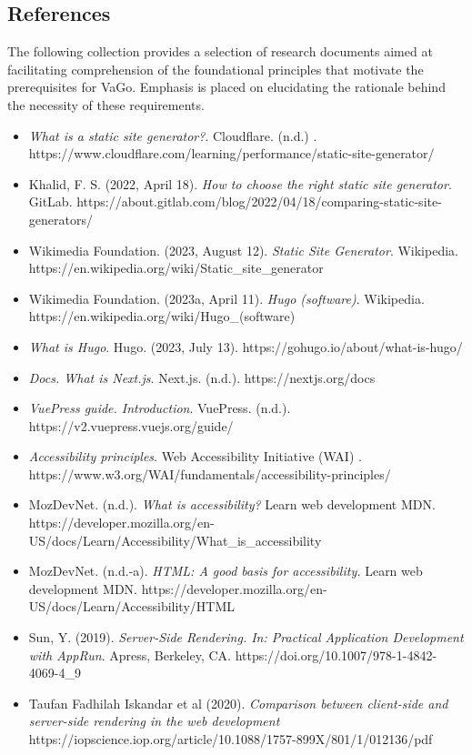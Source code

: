 \subsection{References}\label{subsubsec:srs-references}

The following collection provides a selection of research documents
aimed at facilitating comprehension of the foundational principles that
motivate the prerequisites for VaGo. Emphasis is placed on elucidating
the rationale behind the necessity of these requirements.


\begin{itemize}
    \item
    \emph{What is a static site generator?}. Cloudflare. (n.d.) .
    https://www.cloudflare.com/learning/performance/static-site-generator/
    \item
    Khalid, F. S. (2022, April 18). \emph{How to choose the right static
    site generator}. GitLab.
    https://about.gitlab.com/blog/2022/04/18/comparing-static-site-generators/
    \item
    Wikimedia Foundation. (2023, August 12). \emph{Static Site Generator}.
    Wikipedia. https://en.wikipedia.org/wiki/Static\_site\_generator
    \item
    Wikimedia Foundation. (2023a, April 11). \emph{Hugo (software)}.
    Wikipedia. https://en.wikipedia.org/wiki/Hugo\_(software)
    \item
    \emph{What is Hugo}. Hugo. (2023, July 13).
    https://gohugo.io/about/what-is-hugo/
    \item
    \emph{Docs. What is Next.js}. Next.js. (n.d.). https://nextjs.org/docs
    \item
    \emph{VuePress guide. Introduction}. VuePress. (n.d.).
    https://v2.vuepress.vuejs.org/guide/
    \item
    \emph{Accessibility principles}. Web Accessibility Initiative (WAI) .
    https://www.w3.org/WAI/fundamentals/accessibility-principles/
    \item
    MozDevNet. (n.d.). \emph{What is accessibility?} Learn web development
    \textbar{} MDN.
    https://developer.mozilla.org/en-US/docs/Learn/Accessibility/What\_is\_accessibility
    \item
    MozDevNet. (n.d.-a). \emph{HTML: A good basis for accessibility.}
    Learn web development \textbar{} MDN.
    https://developer.mozilla.org/en-US/docs/Learn/Accessibility/HTML
    \item
    Sun, Y. (2019). \emph{Server-Side Rendering. In: Practical Application
    Development with AppRun}. Apress, Berkeley, CA.
    https://doi.org/10.1007/978-1-4842-4069-4\_9
    \item
    Taufan Fadhilah Iskandar et al (2020). \emph{Comparison between
    client-side and server-side rendering in the web development}
    https://iopscience.iop.org/article/10.1088/1757-899X/801/1/012136/pdf
\end{itemize}

